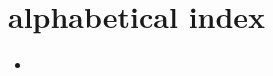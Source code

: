 \documentclass[letterpaper,10pt,english]{sphinxmanual}
\begin{document}
\chapter{alphabetical index}
\label{\detokenize{index:alphabetical-index}}\begin{itemize}
\item {} 

\end{itemize}



\renewcommand{\indexname}{Index}
\printindex
\end{document}
